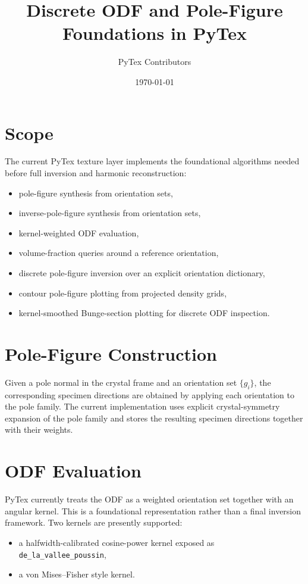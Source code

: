 \documentclass[11pt]{article}
\title{Discrete ODF and Pole-Figure Foundations in PyTex}
\author{PyTex Contributors}
\date{\today}
\begin{document}
\maketitle

\section{Scope}

The current PyTex texture layer implements the foundational algorithms needed before full inversion and harmonic reconstruction:

\begin{itemize}
  \item pole-figure synthesis from orientation sets,
  \item inverse-pole-figure synthesis from orientation sets,
  \item kernel-weighted ODF evaluation,
  \item volume-fraction queries around a reference orientation,
  \item discrete pole-figure inversion over an explicit orientation dictionary,
  \item contour pole-figure plotting from projected density grids,
  \item kernel-smoothed Bunge-section plotting for discrete ODF inspection.
\end{itemize}

\section{Pole-Figure Construction}

Given a pole normal in the crystal frame and an orientation set $\{g_i\}$, the corresponding specimen directions are obtained by applying each orientation to the pole family. The current implementation uses explicit crystal-symmetry expansion of the pole family and stores the resulting specimen directions together with their weights.

\section{ODF Evaluation}

PyTex currently treats the ODF as a weighted orientation set together with an angular kernel. This is a foundational representation rather than a final inversion framework. Two kernels are presently supported:

\begin{itemize}
  \item a halfwidth-calibrated cosine-power kernel exposed as \texttt{de\_la\_vallee\_poussin},
  \item a von Mises--Fisher style kernel.
\end{itemize}
\end{document}
